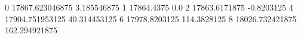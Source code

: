 0 17867.623046875 3.185546875
1 17864.4375 0.0
2 17863.6171875 -0.8203125
4 17904.751953125 40.314453125
6 17978.8203125 114.3828125
8 18026.732421875 162.294921875
